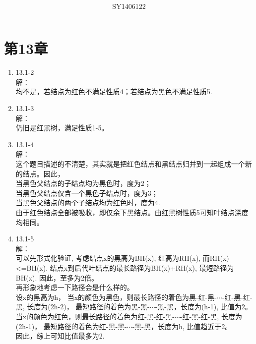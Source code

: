 \documentclass[UTF8]{ctexart}
\begin{document}
\title{\\}
\vspace{2cm}
\author{\\SY1406122}
\date{}
\maketitle

\section*{第13章}
\begin{enumerate}
    \item 13.1-2 \\
    解：\\
        均不是，若结点为红色不满足性质4；若结点为黑色不满足性质5.
		
	\item 13.1-3 \\
	解：\\
		仍旧是红黑树，满足性质1-5。
		
	\item 13.1-4 \\
	解：\\
		这个题目描述的不清楚，其实就是把红色结点和黑结点归并到一起组成一个新的结点。因此，\\
		当黑色父结点的子结点均为黑色时，度为2；	\\
		当黑色父结点仅含一个黑色子结点时，度为3；	\\
		当黑色父结点的两个子结点均为红色时，度为4.	\\
		由于红色结点全部被吸收，即仅余下黑结点。由红黑树性质5可知叶结点深度均相同。
	
	\item 13.1-5 \\
	解：\\
		可以先形式化验证, 考虑结点x的黑高为BH(x), 红高为RH(x), 而RH(x)<=BH(x).
		结点x到后代叶结点的最长路径为BH(x)+RH(x), 最短路径为BH(x). 因此，至多为2倍。\\
		再形象地考虑一下路径会是什么样的。\\
		设x的黑高为h，
		当x的颜色为黑色，则最长路径的着色为黑-红-黑-$\cdots$-红-黑-红-黑, 长度为(2h-2)，
		最短路径的着色为黑-黑-$\cdots$-黑-黑，长度为(h-1), 比值为2。\\
		当x的颜色为红色，则最长路径的着色为红-黑-红-黑-$\cdots$-红-黑-红-黑, 长度为(2h-1)，
		最短路径的着色为红-黑-黑-$\cdots$-黑-黑，长度为h, 比值趋近于2。\\
		因此，综上可知比值最多为2.
		

\end{enumerate}
\end{document}
